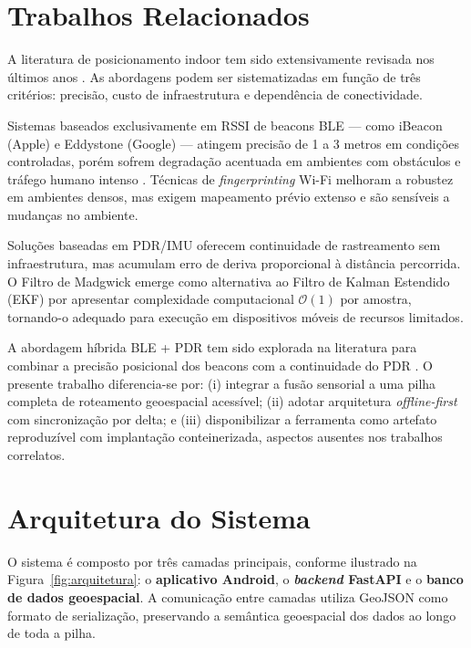 \documentclass[12pt]{article}
\begin{document}
\section{Trabalhos Relacionados}

A literatura de posicionamento indoor tem sido extensivamente revisada nos últimos
anos \cite{Zafari2019, Liu2007}. As abordagens podem ser sistematizadas em função
de três critérios: precisão, custo de infraestrutura e dependência de conectividade.

Sistemas baseados exclusivamente em RSSI de beacons BLE — como iBeacon (Apple) e
Eddystone (Google) — atingem precisão de 1 a 3 metros em condições controladas,
porém sofrem degradação acentuada em ambientes com obstáculos e tráfego humano
intenso \cite{Faragher2015}. Técnicas de \textit{fingerprinting} Wi-Fi melhoram a
robustez em ambientes densos, mas exigem mapeamento prévio extenso e são sensíveis
a mudanças no ambiente.

Soluções baseadas em PDR/IMU oferecem continuidade de rastreamento sem infraestrutura,
mas acumulam erro de deriva proporcional à distância percorrida. O Filtro de Madgwick
\cite{Madgwick2010} emerge como alternativa ao Filtro de Kalman Estendido (EKF) por
apresentar complexidade computacional $\mathcal{O}(1)$ por amostra, tornando-o
adequado para execução em dispositivos móveis de recursos limitados.

A abordagem híbrida BLE + PDR tem sido explorada na literatura para combinar a
precisão posicional dos beacons com a continuidade do PDR \cite{Jimenez2009}.
O presente trabalho diferencia-se por: (i) integrar a fusão sensorial a uma pilha
completa de roteamento geoespacial acessível; (ii) adotar arquitetura
\textit{offline-first} com sincronização por delta; e (iii) disponibilizar a
ferramenta como artefato reproduzível com implantação conteinerizada, aspectos
ausentes nos trabalhos correlatos.

\section{Arquitetura do Sistema}

O sistema é composto por três camadas principais, conforme ilustrado na
Figura~\ref{fig:arquitetura}: o \textbf{aplicativo Android}, o
\textbf{\textit{backend} FastAPI} e o \textbf{banco de dados geoespacial}.
A comunicação entre camadas utiliza GeoJSON como formato de serialização,
preservando a semântica geoespacial dos dados ao longo de toda a pilha.
\end{document}
